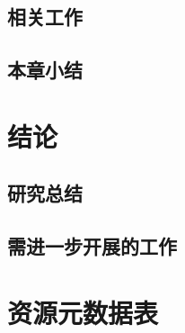 \documentclass[degree=doctor]{thuthesis}
\begin{document}
\section{相关工作}
\section{本章小结}

\chapter{结论}
\section{研究总结}
\section{需进一步开展的工作}

\backmatter

\begin{thebibliography}
\end{thebibliography}

\begin{acknowledgements}
\end{acknowledgements}

\statement

\appendix
\chapter{资源元数据表}

\begin{resume}
\end{resume}
\end{document}
